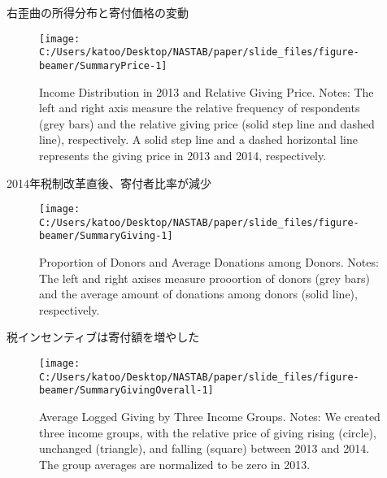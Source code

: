 \documentclass[
  ignorenonframetext,
  aspectratio=169,
]{beamer}
\begin{document}
\begin{frame}{右歪曲の所得分布と寄付価格の変動}
\protect\hypertarget{ux53f3ux6b6aux66f2ux306eux6240ux5f97ux5206ux5e03ux3068ux5bc4ux4ed8ux4fa1ux683cux306eux5909ux52d5}{}
\begin{figure}[t]

{\centering \texttt{[image: C:/Users/katoo/Desktop/NASTAB/paper/slide\_files/figure-beamer/SummaryPrice-1]} 

}

\caption{Income Distribution in 2013 and Relative Giving Price. Notes: The left and right axis measure the relative frequency of respondents (grey bars) and the relative giving price (solid step line and dashed line), respectively. A solid step line and a dashed horizontal line represents the giving price in 2013 and 2014, respectively.}\label{fig:SummaryPrice}
\end{figure}
\end{frame}

\begin{frame}{2014年税制改革直後、寄付者比率が減少}
\protect\hypertarget{ux5e74ux7a0eux5236ux6539ux9769ux76f4ux5f8cux5bc4ux4ed8ux8005ux6bd4ux7387ux304cux6e1bux5c11}{}
\begin{figure}[t]

{\centering \texttt{[image: C:/Users/katoo/Desktop/NASTAB/paper/slide\_files/figure-beamer/SummaryGiving-1]} 

}

\caption{Proportion of Donors and Average Donations among Donors. Notes: The left and right axises measure prooortion of donors (grey bars) and the average amount of donations among donors (solid line), respectively.}\label{fig:SummaryGiving}
\end{figure}
\end{frame}

\begin{frame}{税インセンティブは寄付額を増やした}
\protect\hypertarget{ux7a0eux30a4ux30f3ux30bbux30f3ux30c6ux30a3ux30d6ux306fux5bc4ux4ed8ux984dux3092ux5897ux3084ux3057ux305f}{}
\begin{figure}[t]

{\centering \texttt{[image: C:/Users/katoo/Desktop/NASTAB/paper/slide\_files/figure-beamer/SummaryGivingOverall-1]} 

}

\caption{Average Logged Giving by Three Income Groups. Notes: We created three income groups, with the relative price of giving rising (circle), unchanged (triangle), and falling (square) between 2013 and 2014. The group averages are normalized to be zero in 2013.}\label{fig:SummaryGivingOverall}
\end{figure}
\end{frame}
\end{document}

